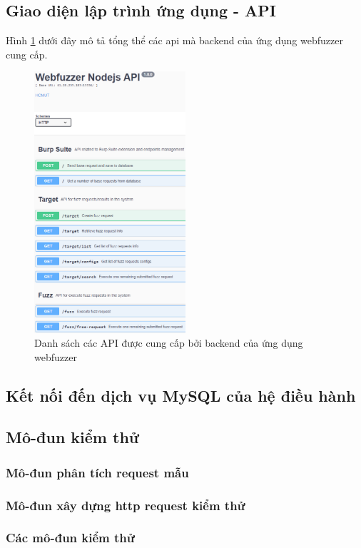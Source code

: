 \subsection{Giao diện lập trình ứng dụng - API}
Hình \ref{fig:swagger-api} dưới đây mô tả tổng thể các \acrshort{api} mà backend của ứng dụng webfuzzer cung cấp.
\begin{figure}[H]
  \centering
    \includegraphics[width=0.5\textwidth,keepaspectratio=true]{images/swagger-api.png}
  \caption{Danh sách các API được cung cấp bởi backend của ứng dụng webfuzzer}
  \label{fig:swagger-api}
\end{figure}
\subsection{Kết nối đến dịch vụ MySQL của hệ điều hành}
\subsection{Mô-đun kiểm thử}
\subsubsection{Mô-đun phân tích request mẫu}
\subsubsection{Mô-đun xây dựng \acrshort{http} request kiểm thử}
\subsubsection{Các mô-đun kiểm thử}
